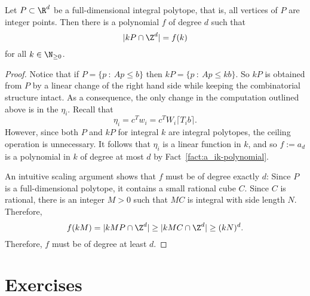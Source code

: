 \begin{theorem}
  Let $P \subset \R^d$ be a full-dimensional integral polytope,
  that is, all vertices of $P$ are integer points.
  Then there is a polynomial $f$ of degree $d$
  such that
  \[
    |kP \cap \Z^d| = f(k)
  \]
  for all $k \in \N_{\geq 0}$.
\end{theorem}
\begin{proof}
  Notice that if $P = \{ p ~:~ Ap \leq b \}$ then $kP = \{ p ~:~ Ap \leq kb \}$.
  So $kP$ is obtained from $P$ by a linear change of the right hand side while keeping the combinatorial structure intact.
  As a consequence, the only change in the computation outlined above is in the $\eta_i$.
  Recall that
  \[
    \eta_i = c^T w_i = c^T W_i \lceil T_i b \rceil.
  \]
  However, since both $P$ and $kP$ for integral $k$ are integral polytopes,
  the ceiling operation is unnecessary.
  It follows that $\eta_i$ is a linear function in $k$,
  and so $f := a_d$ is a polynomial in $k$ of degree at most $d$ by Fact~\ref{fact:a_ik-polynomial}.

  An intuitive scaling argument shows that $f$ must be of degree exactly $d$:
  Since $P$ is a full-dimensional polytope, it contains a small rational cube $C$.
  Since $C$ is rational, there is an integer $M > 0$ such that $MC$ is integral with side length $N$.
  Therefore,
  \[
    f(kM) = |kM P \cap \Z^d| \geq |kMC \cap \Z^d| \geq (kN)^d.
  \]
  Therefore, $f$ must be of degree at least $d$.
\end{proof}









\section*{Exercises}

